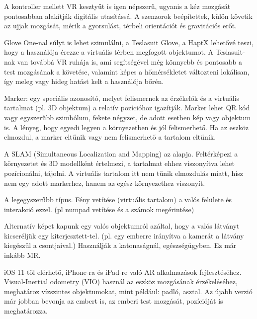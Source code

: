 A kontroller mellett VR kesztyűt is igen népszerű, ugyanis a kéz mozgását pontosabban alakítják digitális utasítássá.  A szenzorok beépítettek, külön követik az ujjak mozgását, mérik a gyorsulást, térbeli orientációt és gravitációs erőt.

Glove One-nal súlyt is lehet szimulálni, a Teslasuit Glove, a HaptX lehetővé teszi, hogy a használója érezze a virtuális térben megfogott objektumot. 
A Teslasuit-nak van továbbá VR ruhája is, ami segítségével még könnyebb és pontosabb a test mozgásának a követése, valamint képes a hőmérsékletet változteni lokálisan, így meleg vagy hideg hatást kelt a használója bőrén.



Marker:  egy speciális azonosító, melyet  felismernek az érzékelők és a virtuális tartalmat (pl. 3D objektum) a relatív pozícióhoz igazítják.
Marker lehet QR kód vagy egyszerűbb szimbólum, fekete négyzet, de adott esetben kép vagy objektum is. A lényeg, hogy egyedi legyen a környezetben és jól felismerhető.
Ha az eszköz elmozdul, a marker eltűnik vagy nem felismerhető a tartalom eltűnik.


A SLAM (Simultaneous Localization and Mapping) az alapja. 
Feltérképezi a környezetet és 3D modellként értelmezi, a tartalmat ehhez viszonyítva lehet pozícionálni, tájolni. A virtuális tartalom itt nem tűnik elmozdulás miatt, hisz nem egy adott markerhez, hanem az egész környezethez viszonyít.


A legegyszerűbb típus. Fény vetítése (virtuális tartalom) a valós felülete és interakció ezzel. (pl numpad vetítése és a számok megérintése)


Alternatív képet kapunk egy valós objektumról azáltal, hogy a valós látványt kicseréljük egy kiterjesztett-tel. (pl. egy emberre irányítva a kamerát a látvány kiegészül a csontjaival.) Használják a katonaságnál, egészségügyben. Ez már inkább MR. 



iOS 11-től elérhető, iPhone-ra és iPad-re való AR alkalmazások fejlesztéséhez. Visual-Inertial odometry (VIO) használ az eszköz mozgásának érzékeléséhez, meghatároz vízszintes objektumokat, mint például: padló, asztal. Az újabb verzió már jobban bevonja az embert is, az emberi test mozgását, pozícióját is meghatározza.

